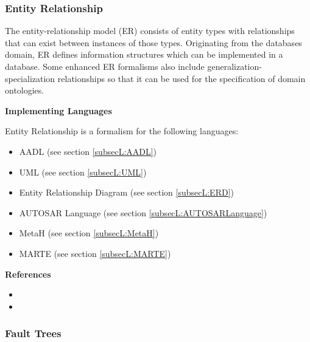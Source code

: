 \subsubsection{Entity Relationship}
\label{subsecF:EntityRelationship}


The entity-relationship model (ER) consists of entity types with relationships that can exist between instances of those types. Originating from the databases domain, ER defines information structures which can be implemented in a database. Some enhanced ER formalisms also include generalization-specialization relationships so that it can be used for the specification of domain ontologies.

\textbf{Implementing Languages}

Entity Relationship is a formalism for the following languages:
\begin{itemize}
	\item AADL (see section \ref{subsecL:AADL})
	\item UML (see section \ref{subsecL:UML})
	\item Entity Relationship Diagram (see section \ref{subsecL:ERD})
	\item AUTOSAR Language (see section \ref{subsecL:AUTOSARLanguage})
	\item MetaH (see section \ref{subsecL:MetaH})
	\item MARTE (see section \ref{subsecL:MARTE})
\end{itemize}





\textbf{References}
\begin{itemize}
	
\item {}
	
\item {}
\end{itemize}



\subsubsection{Fault Trees}
\label{subsecF:FaultTrees}

